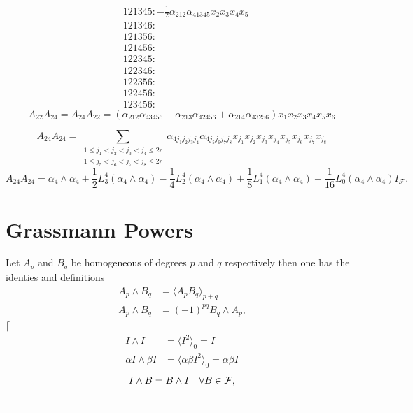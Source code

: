 \documentclass[aps, preprint]{revtex4}
\begin{document}
\begin{align} & 121345 : -\frac{1}{2} \alpha _{2 1 2} \alpha _{4 1 3 4 5} x_{2} x_{3} x_{4} x_{5} \\
 & 121346 : \\
 & 121356 : \\
 & 121456 : \\
 & 122345 : \\
 & 122346 : \\
 & 122356 : \\
 & 122456 : \\
 & 123456 :\end{align}
\begin{equation}A_{2 2} A_{2 4} =A_{2 4} A_{2 2} =\left (\alpha _{2 1 2} \alpha _{4 3 4 5 6} -\alpha _{2 1 3} \alpha _{4 2 4 5 6} +\alpha _{2 1 4} \alpha _{4 3 2 5 6}\right ) x_{1} x_{2} x_{3} x_{4} x_{5} x_{6}
\end{equation}

\bigskip \begin{equation}A_{2 4} A_{2 4} =\sum _{\begin{array}{c}1 \leq j_{1} <j_{2} <j_{3} <j_{4} \leq 2 r \\
1 \leq j_{5} <j_{6} <j_{7} <j_{8} \leq 2 r\end{array}}\alpha _{4 j_{1} j_{2} j_{3} j_{4}} \alpha _{4 j_{5} j_{6} j_{7} j_{8}} x_{j_{1}} x_{j_{2}} x_{j_{3}} x_{j_{4}} x_{j_{5}} x_{j_{6}} x_{j_{7}} x_{j_{8}}
\end{equation}
\begin{equation}A_{2 4} A_{2 4} =\alpha _{4} \wedge \alpha _{4} +\frac{1}{2} L_{3}^{4} \left (\alpha _{4} \wedge \alpha _{4}\right ) -\frac{1}{4} L_{2}^{4} \left (\alpha _{4} \wedge \alpha _{4}\right ) +\frac{1}{8} L_{1}^{4} \left (\alpha _{4} \wedge \alpha _{4}\right ) -\frac{1}{16} L_{0}^{4} \left (\alpha _{4} \wedge \alpha _{4}\right )I_{\mathcal{F}}\text{.}
\end{equation}

\section{Grassmann Powers}
Let $A_{p}$ and $B_{q}$ be homogeneous of degrees $p$ and $q$ respectively then one has the identies and definitions
\begin{align}A_{p} \wedge B_{q} &  = \langle A_{p} B_{q} \rangle _{p +q} \\
A_{p} \wedge B_{q} &  =\left ( -1\right )^{p q} B_{q} \wedge A_{p}\text{,}\end{align}$\lceil $
\begin{align}I \wedge I &  = \langle I^{2} \rangle _{0} =I \\
\alpha  I \wedge \beta  I &  = \langle \alpha  \beta  I^{2} \rangle _{0} =\alpha  \beta  I\end{align}
\begin{equation}I \wedge B =B \wedge I\text{\quad } \forall B \in \mathcal{F}\text{,}
\end{equation}$\rfloor $ 
\end{document}
